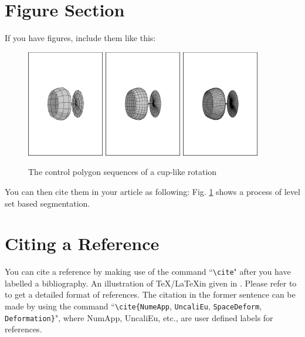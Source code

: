 \documentclass[print]{jicspack}
\begin{document}
\section{Figure Section}
\label{Figuresection}
If you have figures, include them like this:
\begin{figure}[h]
\centering
\includegraphics[angle=-90, width=0.3\textwidth]{cup1.eps}
\includegraphics[angle=-90, width=0.3\textwidth]{cup2.eps}
\includegraphics[angle=-90, width=0.3\textwidth]{cup3.eps}

\caption{The control polygon sequences of a cup-like rotation}
\label{fig:levfig}
\end{figure}

You can then cite them in your article as following: Fig.
\ref{fig:levfig} shows a process of level set based segmentation.



\section{Citing a Reference}
You can cite a reference by making use of the command ``\verb|\cite|" after you have labelled a bibliography\cite{labelbib}.
An illustration of \TeX/\LaTeX in given in \cite{texbook}.
Please refer to \cite{NumeApp,UncaliEu,SpaceDeform,Deformation} to get a detailed format of references.
The citation in the former sentence can be made by using the command ``\verb|\cite{|\verb|NumeApp|, \verb|UncaliEu|, \verb|SpaceDeform|, \verb|Deformation}|", where NumApp, UncaliEu, etc., are user defined labels for references.
\end{document}

